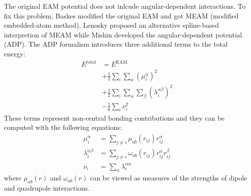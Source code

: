 \documentclass[prb,reprint]{revtex4-2}
\begin{document}
The original EAM potential does not inlcude angular-dependent interactions. To 
fix this problem, Baskes modified the original EAM and got MEAM (modified 
embedded-atom method), Lenosky proposed an alternative spline-based interpretion 
of MEAM  while Mishin developed the angular-dependent potential (ADP). The ADP 
formalism introduces three additional terms to the total energy:
\begin{align}
\label{eq:adp}
E^{total} 
& = E^{\mathrm{EAM}} \nonumber \\
& + \frac{1}{2}\sum_{i}{\sum_{\alpha}{(\mu_{i}^{\alpha})^2}} \nonumber \\
& + \frac{1}{2}\sum_{i}{
    \sum_{\alpha}{\sum_{\beta}{(\lambda_{i}^{\alpha\beta})^2}}} \nonumber \\
& - \frac{1}{6}\sum_{i}{\nu_{i}^{2}}
\end{align}
These terms represent non-central bonding contributions and they can be computed
with the following equations:
\begin{align}
\label{eq:adp_mu}
\mu_{i}^{\alpha} & = \sum_{j \neq i}{\mu_{ab}(r_{ij}) r_{ij}^{\alpha}} \\
\label{eq:adp_lambda}
\lambda_{i}^{\alpha\beta} & = \sum_{j \neq i}{
    \omega_{ab}(r_{ij}) r_{ij}^{\alpha}r_{ij}^{\beta}} \\
\label{eq:adp_nu}
\nu_{i} & = \sum_{\alpha}{\lambda_{i}^{\alpha\alpha}}
\end{align}
where $\mu_{ab}(r)$ and $\omega_{ab}(r)$ can be viewed as measures of the 
strengths of dipole and quadrupole interactions.
\end{document}

